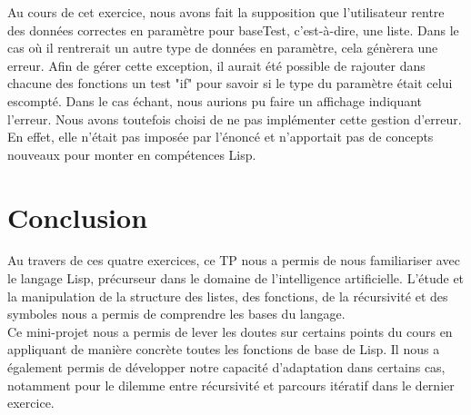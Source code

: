 \documentclass[a4paper, 12pt]{article}
\begin{document}
Au cours de cet exercice, nous avons fait la supposition que l'utilisateur rentre des données correctes en paramètre pour baseTest, c'est-à-dire, une liste. Dans le cas où il rentrerait un autre type de données en paramètre, cela génèrera une erreur. Afin de gérer cette exception, il aurait été possible de rajouter dans chacune des fonctions un test "if" pour savoir si le type du paramètre était celui escompté. Dans le cas échant, nous aurions pu faire un affichage indiquant l'erreur. Nous avons toutefois choisi de ne pas implémenter cette gestion d'erreur. En effet, elle n'était pas imposée par l'énoncé et n'apportait pas de concepts nouveaux pour monter en compétences Lisp.
\newpage

\section*{Conclusion}


Au travers de ces quatre exercices, ce TP nous a permis de nous familiariser avec le langage Lisp, précurseur dans le domaine de l’intelligence artificielle. L’étude et la manipulation de la structure des listes, des fonctions, de la récursivité et des symboles nous a permis de comprendre les bases du langage.\\

Ce mini-projet nous a permis de lever les doutes sur certains points du cours en appliquant de manière concrète toutes les fonctions de base de Lisp. Il nous a également permis de développer notre capacité d’adaptation dans certains cas, notamment pour le dilemme entre récursivité et parcours itératif dans le dernier exercice.
\end{document}
